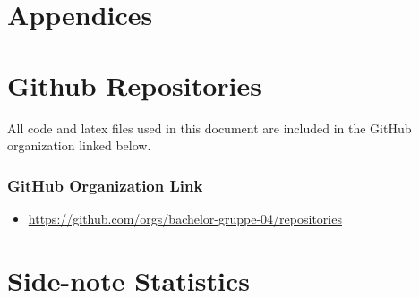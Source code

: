 \chapter*{\LARGE Appendices}

\appendix

\chapter{Github Repositories}

All code and latex files used in this document are included in the GitHub organization linked below.

\subsection*{GitHub Organization Link}

\begin{itemize}
    \item \url{https://github.com/orgs/bachelor-gruppe-04/repositories}
\end{itemize}

\chapter{Side-note Statistics}

